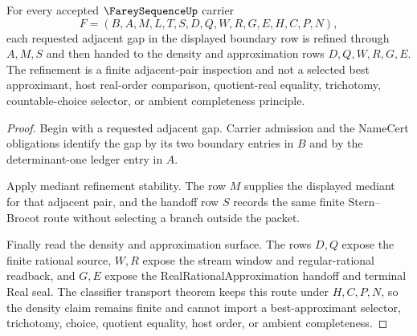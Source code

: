 \begin{theorem}
\label{thm:farey-sequence-adjacency-density}
For every accepted $\FareySequenceUp$ carrier
$$
F=(B,A,M,L,T,S,D,Q,W,R,G,E,H,C,P,N),
$$
each requested adjacent gap in the displayed boundary row is refined through $A,M,S$ and then handed to the density and approximation rows $D,Q,W,R,G,E$. The refinement is a finite adjacent-pair inspection and not a selected best approximant, host real-order comparison, quotient-real equality, trichotomy, countable-choice selector, or ambient completeness principle.
\end{theorem}
\begin{proof}
Begin with a requested adjacent gap. Carrier admission and the NameCert obligations identify the gap by its two boundary entries in $B$ and by the determinant-one ledger entry in $A$.

Apply mediant refinement stability. The row $M$ supplies the displayed mediant for that adjacent pair, and the handoff row $S$ records the same finite Stern--Brocot route without selecting a branch outside the packet.

Finally read the density and approximation surface. The rows $D,Q$ expose the finite rational source, $W,R$ expose the stream window and regular-rational readback, and $G,E$ expose the RealRationalApproximation handoff and terminal Real seal. The classifier transport theorem keeps this route under $H,C,P,N$, so the density claim remains finite and cannot import a best-approximant selector, trichotomy, choice, quotient equality, host order, or ambient completeness.
\end{proof}

